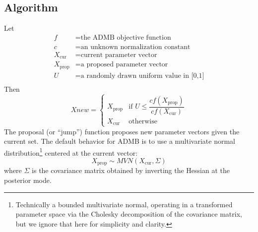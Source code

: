 \documentclass{article}\usepackage[]{graphicx}\usepackage[]{color}
\begin{document}
\subsection{Algorithm}
Let
\begin{align*}
  f&=\text{the ADMB objective function}\\
  c&=\text{an unknown normalization constant}\\
  X_\text{cur}&=\text{current parameter vector}\\
  X_\text{prop}&=\text{a proposed parameter vector}\\
  U&=\text{a randomly drawn uniform value in [0,1]}\\
\end{align*}
Then
\begin{equation}
  Xnew=
  \begin{cases}
    X_\text{prop} & \text{if } U\leq \dfrac{cf(X_\text{prop})}{cf(X_\text{cur})}\\
    X_\text{cur} & \text{otherwise}
  \end{cases}
\end{equation}
The proposal (or ``jump'') function proposes new parameter
vectors given the current set. The default behavior for ADMB
is to use a multivariate normal
distribution\footnote{Technically a bounded multivariate
  normal, operating in a transformed parameter space via the
  Cholesky decomposition of the covariance matrix, but we
  ignore that here for simplicity and clarity.} centered at
the current vector:
\begin{equation*}
  X_\text{prop}\sim MVN(X_\text{cur}, \Sigma)
\end{equation*}
 where $\Sigma$ is the covariance matrix obtained by
 inverting the Hessian at the posterior mode.
\end{document}
